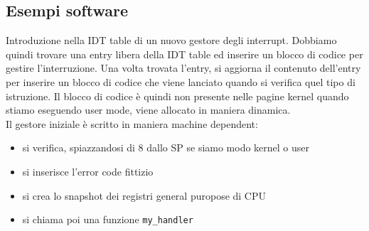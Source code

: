 \documentclass[12pt, oneside]{extbook}
\begin{document}
\subsection*{Esempi software}
Introduzione nella IDT table di un nuovo gestore degli interrupt. Dobbiamo quindi trovare una entry libera della IDT table ed inserire un blocco di codice per gestire l'interruzione. Una volta trovata l'entry, si aggiorna il contenuto dell'entry per inserire un blocco di codice che viene lanciato quando si verifica quel tipo di istruzione. Il blocco di codice è quindi non presente nelle pagine kernel quando stiamo eseguendo user mode, viene allocato in maniera dinamica.\\Il gestore iniziale è scritto in maniera machine dependent:
\begin{itemize}
\item si verifica, spiazzandosi di 8 dallo SP se siamo modo kernel o user
\item si inserisce l'error code fittizio
\item si crea lo snapshot dei registri general puropose di CPU
\item si chiama poi una funzione \texttt{my\_handler}
\end{itemize}
\end{document}
